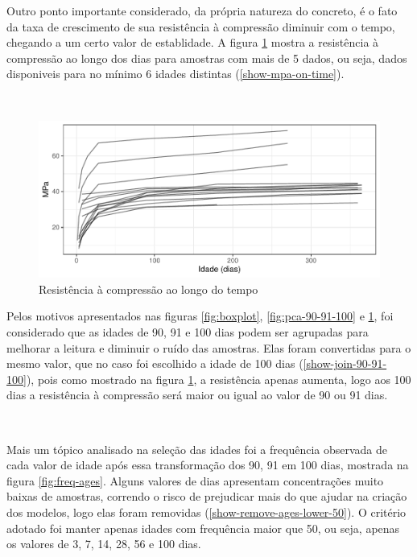 \documentclass[]{article}
\begin{document}
Outro ponto importante considerado, da própria natureza do concreto, é o
fato da taxa de crescimento de sua resistência à compressão diminuir com
o tempo, chegando a um certo valor de establidade. A figura
\ref{fig:mpa-on-time} mostra a resistência à compressão ao longo dos
dias para amostras com mais de 5 dados, ou seja, dados disponiveis para
no mínimo 6 idades distintas (\ref{show-mpa-on-time}).

~

\begin{figure}

{\centering \includegraphics{paper_PT_files/figure-latex/mpa-on-time-1} 

}

\caption{Resistência à compressão ao longo do tempo}\label{fig:mpa-on-time}
\end{figure}

Pelos motivos apresentados nas figuras \ref{fig:boxplot},
\ref{fig:pca-90-91-100} e \ref{fig:mpa-on-time}, foi considerado que as
idades de 90, 91 e 100 dias podem ser agrupadas para melhorar a leitura
e diminuir o ruído das amostras. Elas foram convertidas para o mesmo
valor, que no caso foi escolhido a idade de 100 dias
(\ref{show-join-90-91-100}), pois como mostrado na figura
\ref{fig:mpa-on-time}, a resistência apenas aumenta, logo aos 100 dias a
resistência à compressão será maior ou igual ao valor de 90 ou 91 dias.

~

Mais um tópico analisado na seleção das idades foi a frequência
observada de cada valor de idade após essa transformação dos 90, 91 em
100 dias, mostrada na figura \ref{fig:freq-ages}. Alguns valores de dias
apresentam concentrações muito baixas de amostras, correndo o risco de
prejudicar mais do que ajudar na criação dos modelos, logo elas foram
removidas (\ref{show-remove-ages-lower-50}). O critério adotado foi
manter apenas idades com frequência maior que 50, ou seja, apenas os
valores de 3, 7, 14, 28, 56 e 100 dias.
\end{document}
